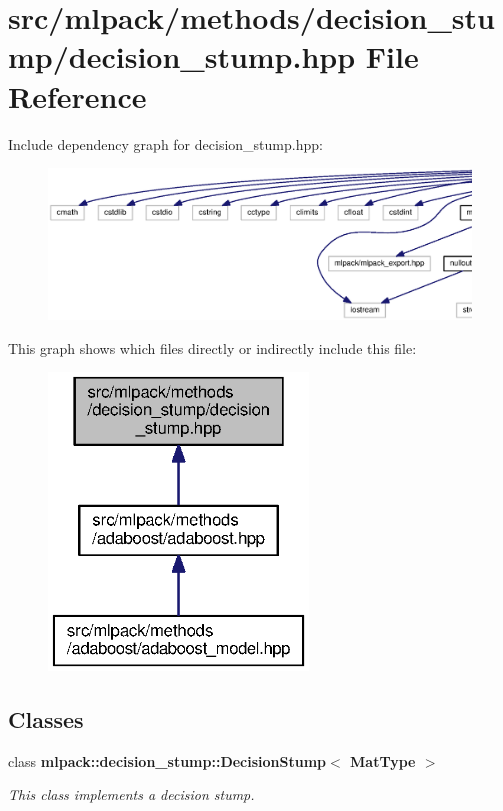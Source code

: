\section{src/mlpack/methods/decision\+\_\+stump/decision\+\_\+stump.hpp File Reference}
\label{decision__stump_8hpp}
Include dependency graph for decision\+\_\+stump.\+hpp\+:
\nopagebreak
\begin{figure}[H]
\begin{center}
\leavevmode
\includegraphics[width=350pt]{decision__stump_8hpp__incl}
\end{center}
\end{figure}
This graph shows which files directly or indirectly include this file\+:
\nopagebreak
\begin{figure}[H]
\begin{center}
\leavevmode
\includegraphics[width=196pt]{decision__stump_8hpp__dep__incl}
\end{center}
\end{figure}
\subsection*{Classes}
\begin{DoxyCompactItemize}
\item 
class {\bf mlpack\+::decision\+\_\+stump\+::\+Decision\+Stump$<$ Mat\+Type $>$}
\begin{DoxyCompactList}\small\item\em This class implements a decision stump. \end{DoxyCompactList}\end{DoxyCompactItemize}
